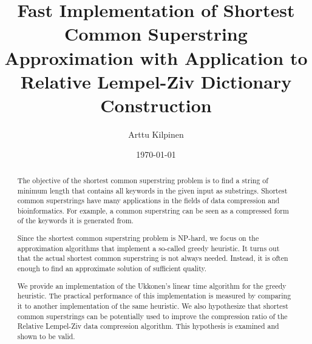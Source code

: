 \documentclass[english,twoside,censored,csm,algorithms-track-2020]{HYthesisML}
\title{Fast Implementation of Shortest Common Superstring Approximation with Application to Relative Lempel-Ziv Dictionary Construction}
\author{Arttu Kilpinen}
\date{\today}
\theoremstyle{plain}
\theoremstyle{definition}
\numberwithin{testexample}{chapter}
\begin{document}
\maketitle



\begin{abstract}

  The objective of the shortest common superstring problem is to find a string of
  minimum length that contains all keywords in the given input as substrings.
  Shortest common superstrings have many applications in the fields of
  data compression and bioinformatics. For example, a common superstring can be seen as a
  compressed form of the keywords it is generated from.

  
  Since the shortest common superstring problem is NP-hard,
  we focus on the approximation algorithms that implement a so-called greedy
  heuristic. It turns out that the actual shortest common superstring
  is not always needed. Instead, it is often enough to find an
  approximate solution of sufficient quality. 

  We provide an implementation of the Ukkonen's linear time algorithm for the
  greedy heuristic. The practical performance of this implementation is measured by
  comparing it to another implementation of the same heuristic.
  We also hypothesize that shortest common superstrings can be potentially used
  to improve the compression ratio of the Relative Lempel-Ziv data compression algorithm.
  This hypothesis is examined and shown to be valid.
  
\end{abstract}

\newpage

\mytableofcontents

\end{document}
